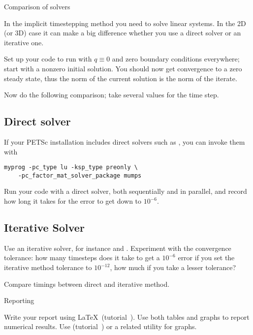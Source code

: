  {Comparison of solvers}

In the implicit timestepping method you need to solve linear
systems. In the 2D (or 3D) case it can make a big difference whether
you use a direct solver or an iterative one.

Set up your code to run with $q\equiv0$ and zero boundary
  conditions everywhere; start with a nonzero initial solution. You
  should now get convergence to a zero steady state, thus the norm of
  the current solution is the norm of the iterate. 

Now do the following comparison; take several values for the time
step.

\subsection*{Direct solver}

If your PETSc installation includes direct solvers such as
, you can invoke them with
\begin{verbatim}
myprog -pc_type lu -ksp_type preonly \
    -pc_factor_mat_solver_package mumps 
\end{verbatim}
Run your code with a direct solver, both sequentially and in parallel,
and record how long it takes for the error to get down to $10^{-6}$.

\subsection*{Iterative Solver}

Use an iterative solver, for instance  and .
Experiment with the convergence tolerance: how many timesteps does it
take to get a $10^{-6}$ error if you set the iterative method
tolerance to $10^{-12}$, how much if you take a lesser tolerance?

Compare timings between direct and iterative method.

 {Reporting}

Write your report using \LaTeX\ (tutorial~). Use both
tables and graphs to report numerical results. Use \n{gnuplot}
(tutorial~) or a related utility for graphs.

